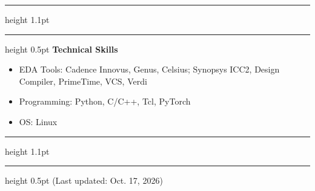 \documentclass[11pt,a4paper]{article}
\newcommand{\doublerule}{%
  \par\vspace{8pt}%
  \hrule height 1.1pt\vspace{1.6pt}\hrule height 0.5pt%
  \vspace{3pt}}
\newcommand{\sect}[1]{\doublerule\textbf{#1}\par\vspace{1pt}}
\begin{document}
\sect{Technical Skills}
\begin{itemize}
  \item EDA Tools: Cadence Innovus, Genus, Celsius; Synopsys ICC2, Design Compiler, PrimeTime, VCS, Verdi
  \item Programming: Python, C/C++, Tcl, PyTorch
  \item OS: Linux
\end{itemize}

\doublerule
\hfill(Last updated: Oct. 17, 2026)
\end{document}
